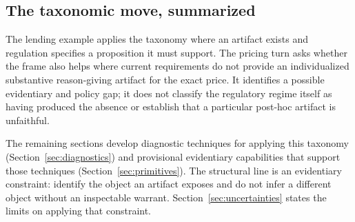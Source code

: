\subsection{The taxonomic move, summarized}
\label{sec:verification-regimes:summary}

The lending example applies the taxonomy where an artifact exists and regulation specifies a proposition it must support. The pricing turn asks whether the frame also helps where current requirements do not provide an individualized substantive reason-giving artifact for the exact price. It identifies a possible evidentiary and policy gap; it does not classify the regulatory regime itself as having produced the absence or establish that a particular post-hoc artifact is unfaithful.

The remaining sections develop diagnostic techniques for applying this taxonomy (Section~\ref{sec:diagnostics}) and provisional evidentiary capabilities that support those techniques (Section~\ref{sec:primitives}). The structural line is an evidentiary constraint: identify the object an artifact exposes and do not infer a different object without an inspectable warrant. Section~\ref{sec:uncertainties} states the limits on applying that constraint.
